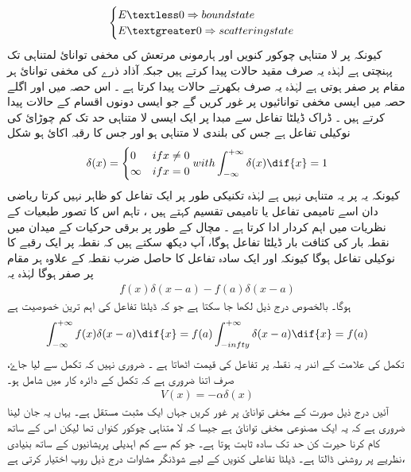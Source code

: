 \begin{align}
\begin{cases}
E\textless0\Rightarrow bound state\\
E\textgreater0\Rightarrow scattering state
\end{cases}
\end{align}
کیونکہ    پر لا متناہی چوکور کنویں اور ہارمونی مرتعش کی مخفی توانائ لمتناہی تک پہنچتی ہے لہٰذہ یہ صرف مقید حالات پیدا کرتے ہیں جبکہ آذاد ذرے کی مخفی توانائ ہر مقام پر صفر ہوتی ہے لہٰذہ یہ صرف بکھرتے حالات پیدا کرتا ہے ۔  اس حصہ میں اور اگلے حصہ میں ایسی مخفی توانائیوں پر غور کریں گے جو ایسی دونوں اقسام کے حالات پیدا کرتے ہیں ۔ 
ڈراک ڈیلٹا تفاعل سے مبدا پر ایک ایسی لا متناہی حد تک کم چوڑائ کی نوکیلی تفاعل ہے جس کی بلندی لا متناہی ہو اور جس کا رقبہ اکائ ہو  شکل  
\begin{align}
\delta(x)=
\begin{cases}
0&if x\neq 0\\
\infty & if x=0
\end{cases}
with \int_{-\infty}^{+\infty}\delta(x)\dif{x}=1
\end{align} 
کیونکہ یہ   پر یہ متناہی نہیں ہے لہٰذہ تکنیکی طور پر ایک تفاعل کو ظاہر نہیں کرتا ریاضی دان اسے تامیمی تفاعل یا تامیمی تقسیم کہتے ہیں ، تاہم اس کا تصور طبعیات کے نظریات میں اہم کردار ادا کرتا ہے ۔  مچال کے طور پر برقی حرکیات کے میدان میں نقطہ بار کی کثافت بار ڈیلٹا تفاعل ہوگا، آپ دیکھ سکتے ہیں کہ   نقطہ   پر ایک رقبے کا نوکیلی تفاعل ہوگا کیونکہ   اور ایک سادہ تفاعل کا حاصل ضرب نقطہ     کے علاوہ ہر مقام پر صفر ہوگا لہٰذہ یہ 
\begin{align}
f(x)\delta(x-a)-f(a)\delta(x-a)
\end{align}
ہوگا۔ بالخصوص درج ذیل لکھا جا سکتا ہے جو کہ ڈیلٹا تفاعل کی اہم ترین خصوصیت ہے 
\begin{align}
\int_{-\infty}^{+\infty}f(x)\delta(x-a)\dif{x}=f(a)\int_{-infty}^{+\infty}\delta(x-a)\dif{x}=f(a)
\end{align}
 تکمل کی علامت کے اندر یہ نقطہ    پر تفاعل کی قیمت اٹھاتا ہے ۔ ضروری نہیں کہ تکمل   سے    لیا جاۓ،  صرف اتنا ضروری ہے کہ تکمل کے دائرہ کار میں   شامل ہو۔ 
\begin{align}
V(x)=-\alpha\delta(x)
\end{align}
آئیں درج ذیل صورت کے مخفی توانائ پر غور کریں جہاں   ایک مثبت مستقل ہے۔ یہاں یہ جان لینا ضروری ہے کہ یہ ایک مصنوعی مخفی توانائ ہے جیسا کہ لا متناہی چوکور کنواں تھا لیکن اس کے ساتھ کام کرنا حیرت کن حد تک سادہ ثابت ہوتا ہے۔ جو کم سے کم اہدیلی پریشانیوں کے ساتھ بنیادی نظریے پر روشنی ڈالتا ہے۔  ڈیلٹا تفاعلی کنویں کے لیے شوڈنگر مشاوات درج ذیل روپ اختیار کرتی ہے،
